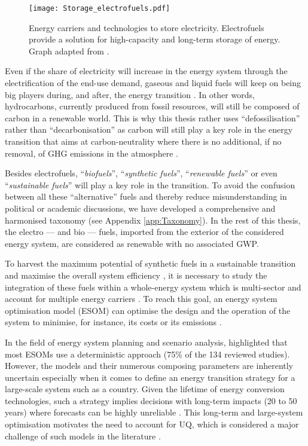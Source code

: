 \begin{figure}[htbp!]
\centering
\texttt{[image: Storage\_electrofuels.pdf]}
\caption{Energy carriers and technologies to store electricity. Electrofuels provide a solution for high-capacity and long-term storage of energy. Graph adapted from \cite{ISPT2017}.}
\label{fig:intro:Storage_electrofuels}
\end{figure}

\newpage
Even if the share of electricity will increase in the energy system through the electrification of the end-use demand, gaseous and liquid fuels will keep on being big players during, and after, the energy transition \cite{Ahlgren2012}. In other words, hydrocarbons, currently produced from fossil resources, will still be composed of carbon in a renewable world. This is why this thesis rather uses ``defossilisation'' rather than ``decarbonisation'' as carbon will still play a key role in the energy transition that aims at carbon-neutrality where there is no additional, if no removal, of \gls{GHG} emissions in the atmosphere \cite{mertens2020carbon}. 

Besides electrofuels, ``\emph{biofuels}'', ``\emph{synthetic fuels}'', ``\emph{renewable fuels}'' or even ``\emph{sustainable fuels}'' will play a key role in the transition. To avoid the confusion between all these ``alternative'' fuels and thereby reduce misunderstanding in political or academic discussions, we have developed a comprehensive and harmonised taxonomy (see Appendix \ref{app:Taxonomy}).  In the rest of this thesis, the electro --- and bio --- fuels, imported from the exterior of the considered energy system, are considered as renewable with no associated \gls{GWP}. 

To harvest the maximum potential of synthetic fuels in a sustainable transition and maximise the overall system efficiency \cite{mathiesen2015}, it is necessary to study the integration of these fuels within a whole-energy system which is multi-sector and account for multiple energy carriers \cite{contino2020whole}. To reach this goal, an energy system optimisation model (ESOM) can optimise the design and the operation of the system to minimise, for instance, its costs or its emissions \cite{zeng2011review}. 

In the field of energy system planning and scenario analysis, \citet{yue2018review} highlighted that most ESOMs use a deterministic approach (75\% of the 134 reviewed studies). However, the models and their numerous composing parameters are inherently uncertain especially when it comes to define an energy transition strategy for a large-scale system such as a country. Given the lifetime of energy conversion technologies, such a strategy implies decisions with long-term impacts (20 to 50 years) where forecasts can be highly unreliable \cite{Moret2017}. This long-term and large-system optimisation motivates the need to account for \gls{UQ}, which is considered a major challenge of such models in the literature \cite{pfenninger2014energy}. %

